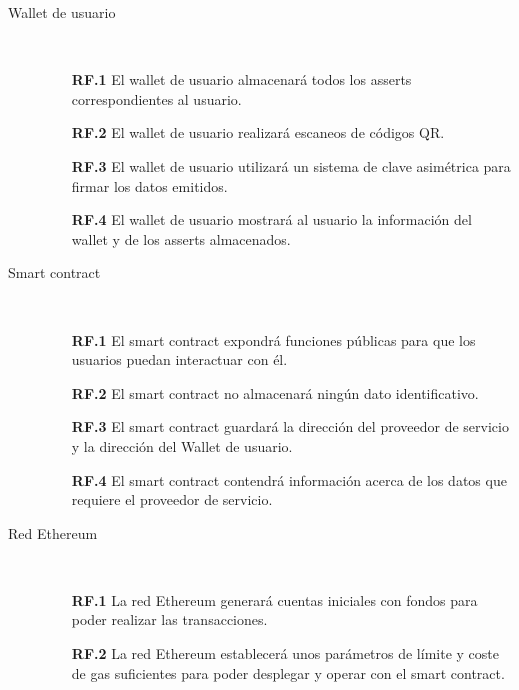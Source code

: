 \documentclass[12pt]{report}
\begin{document}
\begin{description}
\item[Wallet de usuario]\
	\begin{itemize}
	\item[\textbf{RF.1}]El wallet de usuario almacenará todos los asserts correspondientes al usuario.
	\item[\textbf{RF.2}]El wallet de usuario realizará escaneos de códigos QR.
	\item[\textbf{RF.3}]El wallet de usuario utilizará un sistema de clave asimétrica para firmar los datos emitidos.
	\item[\textbf{RF.4}]El wallet de usuario mostrará al usuario la información del wallet y de los asserts almacenados.
	\end{itemize}
\end{description}

\begin{description}
\item[Smart contract]\
	\begin{itemize}
	\item[\textbf{RF.1}]El smart contract expondrá funciones públicas para que los usuarios puedan interactuar con él.
	\item[\textbf{RF.2}]El smart contract no almacenará ningún dato identificativo.
	\item[\textbf{RF.3}]El smart contract guardará la dirección del proveedor de servicio y la dirección del Wallet de usuario.
	\item[\textbf{RF.4}]El smart contract contendrá información acerca de los datos que requiere el proveedor de servicio.
	
	\end{itemize}
\end{description}

\begin{description}
\item[Red Ethereum]\
	\begin{itemize}
	\item[\textbf{RF.1}]La red Ethereum generará cuentas iniciales con fondos para poder realizar las transacciones.
	\item[\textbf{RF.2}]La red Ethereum establecerá unos parámetros de límite y coste de gas suficientes para poder desplegar y operar con el smart contract.
	
	\end{itemize}
\end{description}
\end{document}
